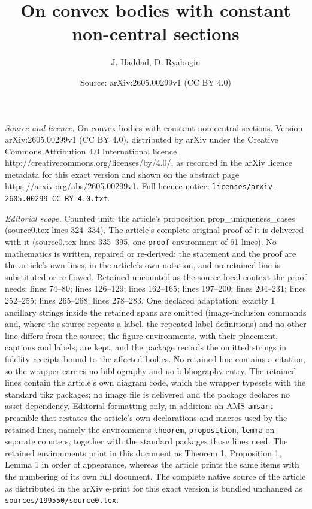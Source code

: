 \documentclass[10pt,a4paper]{amsart}
\title{On convex bodies with constant non-central sections}
\author{J. Haddad, D. Ryabogin}
\date{Source: arXiv:2605.00299v1 (CC BY 4.0)}
\begin{document}
\maketitle

\noindent\emph{Source and licence.} On convex bodies with constant non-central sections. Version arXiv:2605.00299v1 (CC BY 4.0), distributed by arXiv under the Creative Commons Attribution 4.0 International licence, http://creativecommons.org/licenses/by/4.0/, as recorded in the arXiv licence metadata for this exact version and shown on the abstract page https://arxiv.org/abs/2605.00299v1. Full licence notice: \texttt{licenses/arxiv-2605.00299-CC-BY-4.0.txt}.\par\smallskip

\noindent\textit{Editorial scope.} Counted unit: the article's proposition prop\_uniqueness\_cases (source0.tex lines 324--334). The article's complete original proof of it is delivered with it (source0.tex lines 335--395, one \texttt{proof} environment of 61 lines). No mathematics is written, repaired or re-derived: the statement and the proof are the article's own lines, in the article's own notation, and no retained line is substituted or re-flowed.  Retained uncounted as the source-local context the proof needs: lines 74--80; lines 126--129; lines 162--165; lines 197--200; lines 204--231; lines 252--255; lines 265--268; lines 278--283.  One declared adaptation: exactly 1 ancillary strings inside the retained spans are omitted (image-inclusion commands and, where the source repeats a label, the repeated label definitions) and no other line differs from the source; the figure environments, with their placement, captions and labels, are kept, and the package records the omitted strings in fidelity receipts bound to the affected bodies.  No retained line contains a citation, so the wrapper carries no bibliography and no bibliography entry.  The retained lines contain the article's own diagram code, which the wrapper typesets with the standard tikz packages; no image file is delivered and the package declares no asset dependency.  Editorial formatting only, in addition: an AMS \texttt{amsart} preamble that restates the article's own declarations and macros used by the retained lines, namely the environments \texttt{theorem}, \texttt{proposition}, \texttt{lemma} on separate counters, together with the standard packages those lines need.  The retained environments print in this document as Theorem 1, Proposition 1, Lemma 1 in order of appearance, whereas the article prints the same items with the numbering of its own full document.  The complete native source of the article as distributed in the arXiv e-print for this exact version is bundled unchanged as \texttt{sources/199550/source0.tex}.
\end{document}
